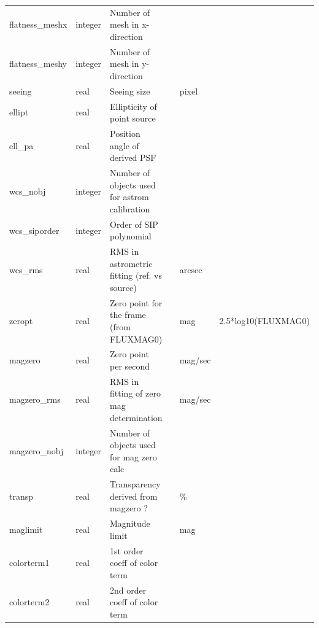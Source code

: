 \documentclass[12pt]{article}
\begin{document}
\begin{table}[thbp]
\begin{center}
{\begin{tabular}{llllll}
flatness\_meshx & integer & Number of mesh in x-direction                       &                            &             &   \\
flatness\_meshy & integer & Number of mesh in y-direction                       &                            &             &   \\
seeing & real & Seeing size                                         &                            & pixel       &   \\
ellipt & real & Ellipticity of point source                         &                            &             &   \\
ell\_pa & real & Position angle of derived PSF                       &                            &             &   \\
wcs\_nobj & integer & Number of objects used for astrom calibration       &                            &             &   \\
wcs\_siporder & integer & Order of SIP polynomial                             &                            &             &   \\
wcs\_rms & real & RMS in astrometric fitting (ref. vs source)         &                            & arcsec      &   \\
zeropt & real & Zero point for the  frame (from FLUXMAG0)           &                            & mag         & 2.5*log10(FLUXMAG0)  \\
magzero & real & Zero point per second                               &                            & mag/sec     &   \\
magzero\_rms & real & RMS in fitting of zero mag determination            &                            & mag/sec     &   \\
magzero\_nobj & integer & Number of objects used for mag zero calc            &                            &             &   \\
transp & real & Transparency derived from magzero ?                 &                            & \%           &   \\
maglimit & real & Magnitude limit                                     &                            & mag         &   \\
colorterm1 & real & 1st order coeff of color term                       &                            &             &   \\
colorterm2 & real & 2nd order coeff of color term                       &                            &             &   \\

\end{tabular}}
\end{center}
\end{table}
\end{document}

